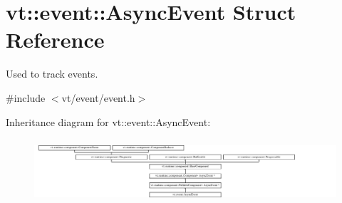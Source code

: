 \hypertarget{structvt_1_1event_1_1_async_event}{}\section{vt\+:\+:event\+:\+:Async\+Event Struct Reference}
\label{structvt_1_1event_1_1_async_event}


Used to track events.  




{\ttfamily \#include $<$vt/event/event.\+h$>$}

Inheritance diagram for vt\+:\+:event\+:\+:Async\+Event\+:\begin{figure}[H]
\begin{center}
\leavevmode
\includegraphics[height=2.400000cm]{structvt_1_1event_1_1_async_event}
\end{center}
\end{figure}
